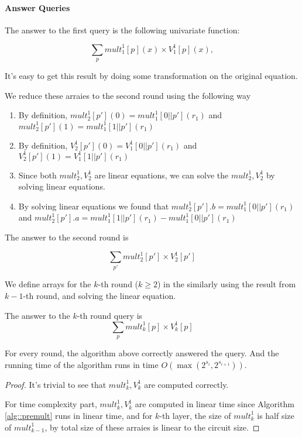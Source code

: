 {	\paragraph{Answer Queries}
	The answer to the first query is the following univariate function:
	
	$$\sum_{p}{mult}_1^1[p](x)\times{V}_1^1[p](x),$$
	
	It's easy to get this result by doing some transformation on the original equation.
	
	We reduce these arraies to the second round using the following way
	
	\begin{enumerate}
		\item By definition, ${mult}_2^1[p'](0)={mult}_1^1[0||p'](r_1)$ and ${mult}_2^1[p'](1)={mult}_1^1[1||p'](r_1)$
		\item By definition, ${V}_2^1[p'](0)={V}_1^1[0||p'](r_1)$ and ${V}_2^1[p'](1)={V}_1^1[1||p'](r_1)$
		
		\item Since both ${mult}_2^1, {V}_2^1$ are linear equations, we can solve the ${mult}_2^1, {V}_2^1$ by solving linear equations.
		\item By solving linear equations we found that ${mult}_2^1[p'].b={mult}_1^1[0||p'](r_1)$ and ${mult}_2^1[p'].a={mult}_1^1[1||p'](r_1)-{mult}_1^1[0||p'](r_1)$
	\end{enumerate}
	
	The answer to the second round is 
	
	$$\sum_{p'}{mult}_2^1[p']\times{V}_2^1[p']$$
	
	We define arrays for the $k$-th round ($k\ge 2$) in the similarly using the result from $k-1$-th round, and solving the linear equation.
	
	The answer to the $k$-th round query is 
	$$\sum_{p}{mult}_k^1[p]\times{V}_k^1[p]$$
	
	\begin{theorem} For every round, the algorithm above correctly answered the query. And the running time of the algorithm runs in time $O(\max(2^{s_i}, 2^{s_{i+1}}))$.
	\end{theorem}
	
	\begin{proof}
		It's trivial to see that ${mult}_k^1, {V}_k^1$ are computed correctly. 
		
		For time complexity part, ${mult}_k^1, {V}_k^1$ are computed in linear time since Algorithm \ref{alg::premult} runs in linear time, and for $k$-th layer, the size of ${mult}_k^1$ is half size of ${mult}_{k-1}^1$, by total size of these arraies is linear to the circuit size.
		

\end{proof}}
